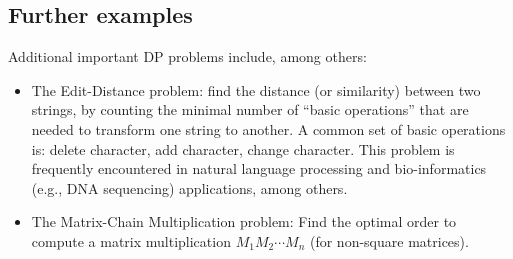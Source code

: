 \subsection*{Further examples}
Additional important DP problems include, among others:
\begin{itemize}
  \item The Edit-Distance problem: find the distance (or similarity) between two strings, by counting the minimal number of ``basic operations'' that are needed to transform one string to another. A common set of basic operations is: delete character, add character, change character. This problem is frequently encountered in natural language processing and bio-informatics (e.g., DNA sequencing) applications, among others.
  \item The Matrix-Chain Multiplication problem: Find the optimal order to compute a matrix multiplication  ${M_1}{M_2} \cdots {M_n}$  (for non-square matrices).
\end{itemize}


